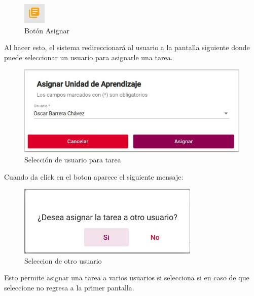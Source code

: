         \begin{figure}[H]
            \centering
            \hypertarget{boton}{\includegraphics[width=0.7\linewidth]{images/Tareas/boton}}
            \caption{Botón Asignar}
            \label{boton}
        \end{figure}

        Al hacer esto, el sistema redireccionará al usuario a la pantalla siguiente donde puede seleccionar un usuario para asignarle una tarea.

        \begin{figure}[H]
            \centering
            \hypertarget{asigna}{\includegraphics[width=0.7\linewidth]{images/Tareas/Asignando}}
            \caption{Selección de usuario para tarea}
            \label{asigna}
        \end{figure}

       Cuando da click en el boton  aparece el siguiente mensaje:
        \begin{figure}[H]
            \centering
            \hypertarget{asignar}{\includegraphics[width=0.7\linewidth]{images/Tareas/Asignarotro}}
            \caption{Seleccion de otro usuario}
            \label{asignar}
        \end{figure}
        Esto permite asignar una tarea a varios usuarios si selecciona si en caso de que seleccione no regresa a la primer pantalla.

